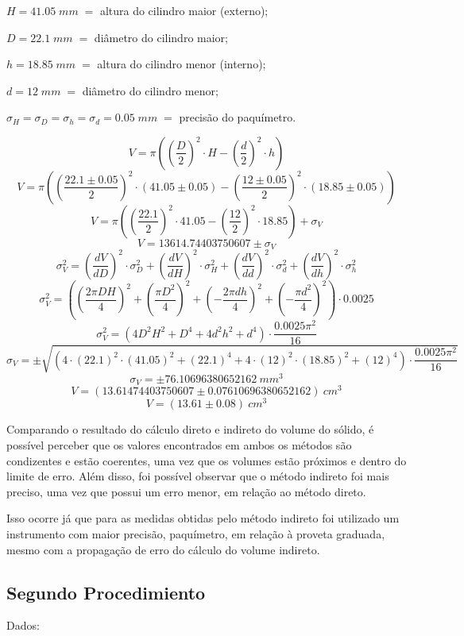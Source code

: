 \documentclass{article}
\begin{document}
$H = 41.05\;mm\;=$ altura do cilindro maior (externo);

$D = 22.1\;mm\;=$ diâmetro do cilindro maior;

$h = 18.85\;mm\;=$ altura do cilindro menor (interno);

$d = 12\;mm\;=$ diâmetro do cilindro menor;

$\sigma_H = \sigma_D = \sigma_h = \sigma_d = 0.05\;mm\;=$ precisão do paquímetro.

\[V = \pi \left(\left(\frac{D}{2}\right)^2\cdot H-\left(\frac{d}{2}\right)^2\cdot h\right)\]
\[V = \pi \left(\left(\frac{22.1\pm0.05}{2}\right)^2\cdot \left(41.05\pm0.05\right)-\left(\frac{12\pm0.05}{2}\right)^2\cdot \left(18.85\pm0.05\right)\right)\]
\[V = \pi \left(\left(\frac{22.1}{2}\right)^2\cdot 41.05-\left(\frac{12}{2}\right)^2\cdot 18.85\right)+\sigma_V\]
\[V = 13614.74403750607\pm\sigma_V\]
\vline
\[\sigma_V^2=\left(\frac{dV}{dD}\right)^2\cdot\sigma_D^2+\left(\frac{dV}{dH}\right)^2\cdot\sigma_H^2+\left(\frac{dV}{dd}\right)^2\cdot\sigma_d^2+\left(\frac{dV}{dh}\right)^2\cdot\sigma_h^2\]
\[\sigma_V^2=\left(\left(\frac{2\pi DH}{4}\right)^2+\left(\frac{\pi D^2}{4}\right)^2+\left(-\frac{2\pi dh}{4}\right)^2+\left(-\frac{\pi d^2}{4}\right)^2\right)\cdot0.0025\]
\[\sigma_V^2=\left(4D^2H^2+D^4+4d^2h^2+d^4\right)\cdot\frac{0.0025\pi^2}{16}\]
\[\sigma_V=\pm\sqrt{\left(4\cdot\left(22.1\right)^2\cdot\left(41.05\right)^2+\left(22.1\right)^4+4\cdot\left(12\right)^2\cdot\left(18.85\right)^2+\left(12\right)^4\right)\cdot\frac{0.0025\pi^2}{16}}\]
\[\sigma_V=\pm76.10696380652162\:mm^3\]
\[V = (13.61474403750607\pm0.07610696380652162)\:cm^3\]
\[V = (13.61\pm0.08)\:cm^3\]

Comparando o resultado do cálculo direto e indireto do volume do sólido, é possível perceber que os valores encontrados em ambos os métodos são condizentes e estão coerentes, uma vez que os volumes estão próximos e dentro do limite de erro. Além disso, foi possível observar que o método indireto foi mais preciso, uma vez que possui um erro menor, em relação ao método direto.

Isso ocorre já que para as medidas obtidas pelo método indireto foi utilizado um instrumento com maior precisão, paquímetro, em relação à proveta graduada, mesmo com a propagação de erro do cálculo do volume indireto.


\subsection{Segundo Procedimiento}
Dados:
\end{document}
